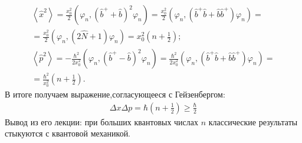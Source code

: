 	\begin{gather*}
	\left<\hat x^2\right>=\frac{x_0^2}{2}(\varphi_n,(\hat b^++\hat b)^2\varphi_n)=\frac{x_0^2}{2}(\varphi_n,(\hat b^+\hat b+\hat b\hat b^+)\varphi_n)=\\
	=\frac{x_0^2}{2}(\varphi_n,(2\hat N+1)\varphi_n)=x_0^2\left(n+\frac{1}{2}\right);\\
	\left<\hat p^2\right>=-\frac{\hbar^2}{2x_0^2}(\varphi_n,(\hat b^+-\hat b)^2\varphi_n)=\frac{\hbar^2}{2x_0^2}(\varphi_n,(\hat b^+\hat b+\hat b\hat b^+)\varphi_n)=\\
	=\frac{\hbar^2}{x_0^2}\left(n+\frac{1}{2}\right).
	\end{gather*}
	В итоге получаем выражение,согласующееся с Гейзенбергом:
	\begin{gather*}
	\Delta x\Delta p=\hbar\left(n+\frac{1}{2}\right)\ge\frac{\hbar}{2}
	\end{gather*}
	Вывод из его лекции: при больших квантовых числах $n$ классические результаты стыкуются с квантовой механикой.
